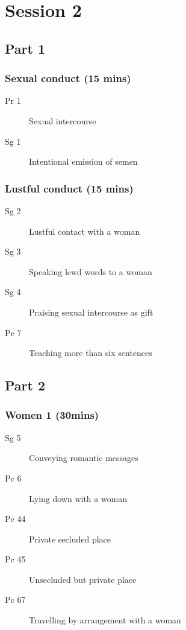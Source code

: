 \documentclass[11pt,oneside]{memoir}
\begin{document}
\chapter{Session 2}

\begin{multicols}{2}

\section{Part 1}

\subsection{Sexual conduct (15 mins)}

\begin{description}
\item[Pr 1] Sexual intercourse
\item[Sg 1] Intentional emission of semen
\end{description}

\subsection{Lustful conduct (15 mins)}

\begin{description}
\item[Sg 2] Lustful contact with a woman
\item[Sg 3] Speaking lewd words to a woman
\item[Sg 4] Praising sexual intercourse as gift
\item[Pc 7] Teaching more than six sentences
\end{description}

\columnbreak

\section{Part 2}

\subsection{Women 1 (30mins)}

\begin{description}
\item[Sg 5] Conveying romantic messages
\item[Pc 6] Lying down with a woman
\item[Pc 44] Private secluded place
\item[Pc 45] Unsecluded but private place
\item[Pc 67] Travelling by arrangement with a woman
\end{description}

\end{multicols}
\end{document}
